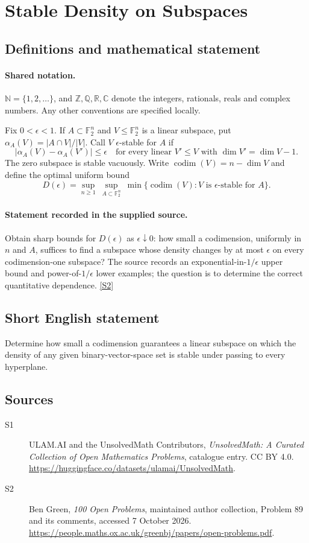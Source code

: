 \documentclass[11pt]{article}
\newcommand{\sref}[2]{\hyperlink{source:#1:#2}{[S#2]}}
\begin{document}
\section{Stable Density on Subspaces}\label{statement}

\subsection{Definitions and mathematical statement}

\paragraph{Shared notation.}$\mathbb N=\{1,2,\ldots\}$, and $\mathbb Z,\mathbb Q,\mathbb R,\mathbb C$ denote the integers, rationals, reals and complex numbers. Any other conventions are specified locally.


Fix $0<\epsilon<1$. If $A\subset\mathbb F_2^n$ and $V\leq\mathbb F_2^n$ is a linear subspace, put $\alpha_A(V)=|A\cap V|/|V|$. Call $V$ $\epsilon$-stable for $A$ if
\[
 |\alpha_A(V)-\alpha_A(V')|\leq\epsilon
 \quad\text{for every linear }V'\leq V\text{ with }\dim V'=\dim V-1.
\]
The zero subspace is stable vacuously. Write $\operatorname{codim}(V)=n-\dim V$ and define the optimal uniform bound
\[
 D(\epsilon)=\sup_{n\geq1}\ \sup_{A\subset\mathbb F_2^n}\
 \min\{\operatorname{codim}(V):V\text{ is }\epsilon\text{-stable for }A\}.
\]
\paragraph{Statement recorded in the supplied source.}
Obtain sharp bounds for $D(\epsilon)$ as $\epsilon\downarrow0$: how small a codimension, uniformly in $n$ and $A$, suffices to find a subspace whose density changes by at most $\epsilon$ on every codimension-one subspace? The source records an exponential-in-$1/\epsilon$ upper bound and power-of-$1/\epsilon$ lower examples; the question is to determine the correct quantitative dependence. \sref{statement}{2}
\subsection{Short English statement}
Determine how small a codimension guarantees a linear subspace on which the density of any given binary-vector-space set is stable under passing to every hyperplane.
\subsection{Sources}
\begin{description}
\item[\hypertarget{source:statement:1}{S1}] ULAM.AI and the UnsolvedMath Contributors, \emph{UnsolvedMath: A Curated Collection of Open Mathematics Problems}, catalogue entry. CC BY 4.0. \url{https://huggingface.co/datasets/ulamai/UnsolvedMath}.
\item[\hypertarget{source:statement:2}{S2}] Ben Green, \emph{100 Open Problems}, maintained author collection, Problem 89 and its comments, accessed 7 October 2026. \url{https://people.maths.ox.ac.uk/greenbj/papers/open-problems.pdf}.
\end{description}
\label{end:statement}
\end{document}
